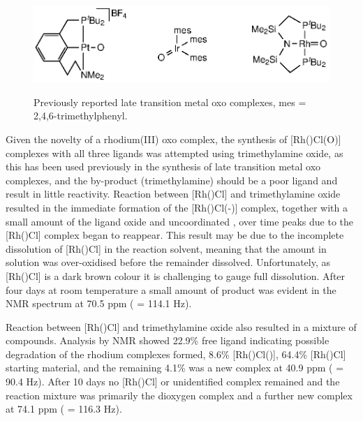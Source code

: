 \begin{figure}[htb]
\begin{center}
\vspace{0.5cm}
\includegraphics{../Figures/Rhodiumotheroxo.eps}
\caption[Previously reported late transition metal oxo complexes]{Previously reported late transition metal oxo complexes, mes = 2,4,6-trimethylphenyl.\cite{Poverenov2008, Verat2008, Tsvetkov2013}}
\vspace{0.2cm}
\label{Rhodiumotheroxo}
\end{center}
\end{figure}
\vspace{0.2cm}

Given the novelty of a rhodium(III) oxo complex, the synthesis of [Rh(\tBuxantphos)Cl(O)] complexes with all three \tBuxantphos{} ligands was attempted using trimethylamine oxide, as this has been used previously in the synthesis of late transition metal oxo complexes,\cite{Motherwell1993, Tsvetkov2013} and the by-product (trimethylamine) should be a poor ligand and result in little reactivity.    Reaction between [Rh(\tBusixantphos)Cl] and trimethylamine oxide resulted in the immediate formation of the [Rh(\tBusixantphos)Cl(-)] complex, together with a small amount of the ligand oxide and uncoordinated \tBusixantphos, over time peaks due to the [Rh(\tBusixantphos)Cl] complex began to reappear.  This result may be due to the incomplete dissolution of [Rh(\tBusixantphos)Cl] in the  reaction solvent, meaning that the amount in solution was over-oxidised before the remainder dissolved.  Unfortunately, as [Rh(\tBusixantphosk)Cl] is a dark brown colour it is challenging to gauge full dissolution.  After four days at room temperature a small amount of product was evident in the \phosphorus{} NMR spectrum at 70.5 ppm (\JRhP{} = 114.1 Hz).  

Reaction between [Rh(\tButhixantphosk)Cl] and trimethylamine oxide also resulted in a mixture of compounds.  Analysis by \phosphorus{} NMR showed 22.9\%{} free \tButhixantphos{} ligand indicating possible degradation of the rhodium complexes formed, 8.6\%{} [Rh(\tBusixantphosk)Cl()], 64.4\% [Rh(\tButhixantphosk)Cl] starting material, and the remaining 4.1\% was a new complex at 40.9 ppm (\JRhP{} = 90.4 Hz).  After 10 days no [Rh(\tButhixantphosk)Cl] or unidentified complex remained and the reaction mixture was primarily the dioxygen complex and a further new complex at 74.1 ppm (\JRhP{} = 116.3 Hz).  

